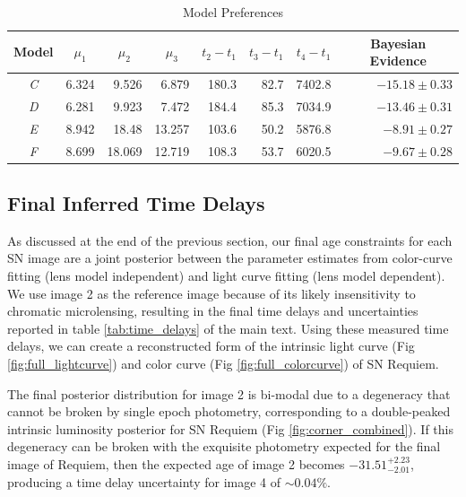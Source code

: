 \documentclass[12pt,dvipsnames]{article}
\begin{document}
\begin{table}[h]
\begin{tabular}{crrrrrrr}
    
    
    \multicolumn{1}{c}{Model} &\multicolumn{1}{c}{$\mu_1$} & \multicolumn{1}{c}{$\mu_2$} &\multicolumn{1}{c}{$\mu_3$} &\multicolumn{1}{c}{$t_2-t_1$} & \multicolumn{1}{c}{$t_3-t_1$}& \multicolumn{1}{c}{$t_4-t_1$} & \multicolumn{1}{c}{Bayesian Evidence}\\
\midrule
\textit{C} & 6.324 & 9.526 & 6.879 & 180.3 & 82.7&7402.8&$-15.18\pm0.33$ \\
\textit{D} & 6.281 & 9.923 & 7.472 & 184.4 & 85.3&7034.9&$-13.46\pm0.31$ \\
\textit{E} &8.942  & 18.48 & 13.257 & 103.6 & 50.2&5876.8&$-8.91\pm0.27$ \\
\textit{F} & 8.699 & 18.069 & 12.719 & 108.3 & 53.7&6020.5&$-9.67\pm0.28$ \\
\end{tabular}
\caption{\label{tab:model_evidence}Model Preferences}
\end{table}

\subsection*{Final Inferred Time Delays}

As discussed at the end of the previous section, our final age constraints for each SN image are a joint posterior between the parameter estimates from color-curve fitting (lens model independent) and light curve fitting (lens model dependent). We use image 2 as the reference image because of its likely insensitivity to chromatic microlensing,  resulting in the final time delays and uncertainties reported in table \ref{tab:time_delays} of the main text. Using these measured time delays, we can create a reconstructed form of the intrinsic light curve (Fig \ref{fig:full_lightcurve}) and color curve (Fig \ref{fig:full_colorcurve}) of SN Requiem.


The final posterior distribution for image 2 is bi-modal due to a degeneracy that cannot be broken by single epoch photometry, corresponding to a double-peaked intrinsic luminosity posterior for SN Requiem (Fig \ref{fig:corner_combined}). If this degeneracy can be broken with the exquisite photometry expected for the final image of Requiem, then the expected age of image 2 becomes $-31.51^{+2.23}_{-2.01}$, producing a time delay uncertainty for image 4 of $\sim0.04\%$.
\end{document}
